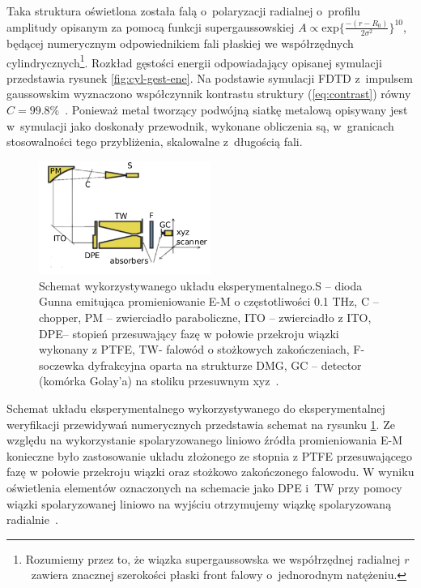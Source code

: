 Taka struktura oświetlona została falą o~polaryzacji radialnej o~profilu amplitudy opisanym za pomocą funkcji supergaussowskiej $A \propto \textrm{exp}\{\frac{-(r-R_0)}{2\sigma^2}\}^{10}$, będącej numerycznym odpowiednikiem fali płaskiej we współrzędnych cylindrycznych\footnote{Rozumiemy przez to, że wiązka supergaussowska we współrzędnej radialnej $r$~zawiera znacznej szerokości płaski front falowy o~jednorodnym natężeniu.}. Rozkład gęstości energii odpowiadający opisanej symulacji przedstawia rysunek \ref{fig:cyl-gest-ene}. Na podstawie symulacji FDTD z~impulsem gaussowskim wyznaczono współczynnik kontrastu struktury (\ref{eq:contrast}) równy $C=99.8\%$~\cite{Yavorskiy:14}. Ponieważ metal tworzący podwójną siatkę metalową opisywany jest w~symulacji jako doskonały przewodnik, wykonane obliczenia są, w~granicach stosowalności tego przybliżenia, skalowalne z~długością fali.

\begin{figure}
	\centering
	\label{fig:opt-exp-schem}
	\includegraphics[width=0.5\textwidth]{images/thz/exp-express-schem.png}
	\caption{Schemat wykorzystywanego układu eksperymentalnego.S – dioda Gunna emitująca promieniowanie E-M o częstotliwości 0.1 THz, C – chopper, PM – zwierciadło paraboliczne, ITO – zwierciadło z ITO, DPE– stopień przesuwający fazę w połowie przekroju wiązki wykonany z PTFE, TW- falowód o stożkowych zakończeniach, F- soczewka dyfrakcyjna oparta na strukturze DMG, GC – detector (komórka Golay'a) na stoliku przesuwnym xyz~\cite{Yavorskiy:14}.}
\end{figure}

Schemat układu eksperymentalnego wykorzystywanego do eksperymentalnej weryfikacji przewidywań numerycznych przedstawia schemat na rysunku \ref{fig:opt-exp-schem}. Ze względu na wykorzystanie spolaryzowanego liniowo źródła promieniowania E-M konieczne było zastosowanie układu złożonego ze stopnia z PTFE przesuwającego fazę w połowie przekroju wiązki oraz stożkowo zakończonego falowodu. W wyniku oświetlenia elementów oznaczonych na schemacie jako DPE i~TW przy pomocy wiązki spolaryzowanej liniowo na wyjściu otrzymujemy wiązkę spolaryzowaną radialnie~\cite{grosjean2008linear}.

